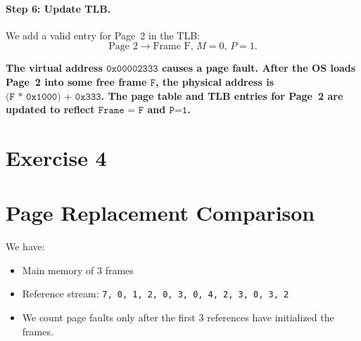 \documentclass{article}
\newcommand{\exercise}[1]{
    \section*{Exercise #1}
    \markboth{Exercise #1}{}
}
\begin{document}
\paragraph{Step 6: Update TLB.}
We add a valid entry for Page~2 in the TLB:
\[
\text{Page~2} \longrightarrow \text{Frame~F},\, M=0,\, P=1.
\]

\textbf{The virtual address \(\texttt{0x00002333}\) causes a page
fault. After the OS loads Page~2 into some free frame \(\texttt{F}\),
the physical address is \(\texttt{(F * 0x1000) + 0x333}\). The page
table and TLB entries for Page~2 are updated to reflect
\(\texttt{Frame = F}\) and \(\texttt{P=1}\).}










\newpage
\exercise{4}



\section*{Page Replacement Comparison}

We have:
\begin{itemize}
  \item Main memory of 3 frames
  \item Reference stream: \texttt{7, 0, 1, 2, 0, 3, 0, 4, 2, 3, 0, 3, 2}
  \item We count page faults only after the first 3 references have 
  initialized the frames.
\end{itemize}

\bigskip

\renewcommand{\arraystretch}{1.2}
\setlength{\tabcolsep}{0.7em}
\end{document}
